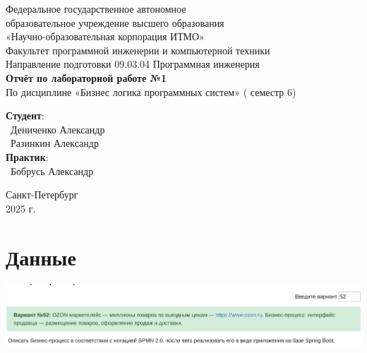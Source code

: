 \documentclass{article}
\begin{document}
\begin{center}
    \Large
    Федеральное государственное автономное \\
    образовательное учреждение высшего образования \\ 
    «Научно-образовательная корпорация ИТМО»\\
    \vspace{0.5cm}
    \large
    Факультет программной инженерии и компьютерной техники \\
    Направление подготовки 09.03.04 Программная инженерия \\
    \vspace{1cm}
    \Large
    \textbf{Отчёт по лабораторной работе №1} \\
        По дисциплине «Бизнес логика программных систем» ( семестр 6)\\
    \large
    \vspace{8cm}

    \begin{minipage}{.33\textwidth}
    \end{minipage}
    \hfill
    \begin{minipage}{.4\textwidth}
    
        \textbf{Студент}: \vspace{.1cm} \\
        \ Дениченко Александр\\
        \ Разинкин Александр\\
        \textbf{Практик}:  \\
        \ Бобрусь Александр
    \end{minipage}
    \vfill
Санкт-Петербург\\ 2025 г.
\end{center}
\pagestyle{empty}
\newpage
\pagestyle{plain}

\section*{Данные}
\begin{center}
    \includegraphics[width=.9\textwidth]{lab}
\end{center}
\end{document}
